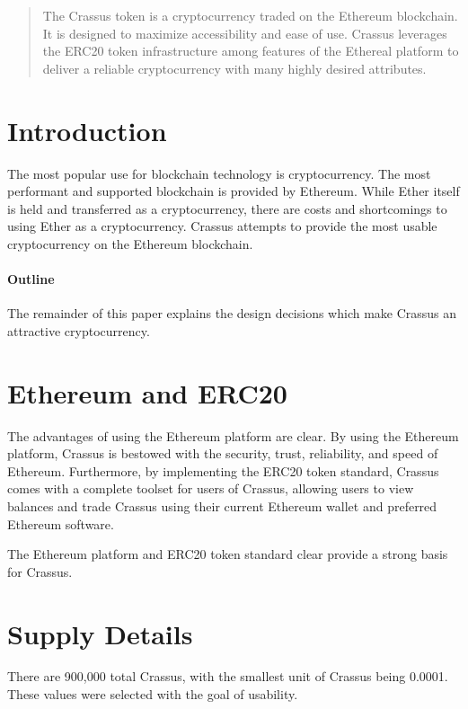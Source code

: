 \documentclass[12pt]{article}
\begin{document}
\maketitle

\begin{abstract}
The Crassus token is a cryptocurrency traded on the Ethereum blockchain.  It is designed to maximize accessibility and ease of use.  Crassus leverages the ERC20 token infrastructure among features of the Ethereal platform to deliver a reliable cryptocurrency with many highly desired attributes.
\end{abstract}

\section{Introduction}
The most popular use for blockchain technology is cryptocurrency.  The most performant and supported blockchain is provided by Ethereum.  While Ether itself is held and transferred as a cryptocurrency, there are costs and shortcomings to using Ether as a cryptocurrency.  Crassus attempts to provide the most usable cryptocurrency on the Ethereum blockchain.

\paragraph{Outline}
The remainder of this paper explains the design decisions which make Crassus an attractive cryptocurrency.

\section{Ethereum and ERC20}\label{Ethereum and ERC20}
The advantages of using the Ethereum platform are clear.  By using the Ethereum platform, Crassus is bestowed with the security, trust, reliability, and speed of Ethereum.  Furthermore, by implementing the ERC20 token standard, Crassus comes with a complete toolset for users of Crassus, allowing users to view balances and trade Crassus using their current Ethereum wallet and preferred Ethereum software.

The Ethereum platform and ERC20 token standard clear provide a strong basis for Crassus.

\section{Supply Details}\label{Supply Details}
There are 900,000 total Crassus, with the smallest unit of Crassus being 0.0001.  These values were selected with the goal of usability.
\end{document}
